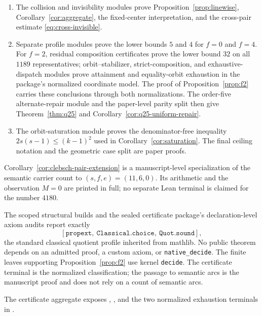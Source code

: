 \begin{enumerate}[leftmargin=2.2em]
      maximum $W(k)=\lfloor(k-1)^2/4\rfloor$, derive the empty-carrier range
      from the phase inequality itself, and prove
      Theorem~\ref{thm:parameterized-repair} for semantic legal-pair finsets.
\item The collision and invisibility modules prove
      Proposition~\ref{prop:linewise}, Corollary~\ref{cor:aggregate}, the
      fixed-center interpretation, and the cross-pair estimate
      \eqref{eq:cross-invisible}.
\item Separate profile modules prove the lower bounds $5$ and $4$ for
      $f=0$ and $f=4$.  For $f=2$, residual composition certificates prove
      the lower bound $32$ on all $1189$ representatives; orbit--stabilizer,
      strict-composition, and exhaustive-dispatch modules prove attainment
      and equality-orbit exhaustion in the package's normalized coordinate
      model.  The proof of Proposition~\ref{prop:f2} carries these conclusions
      through both normalizations.  The order-five
      alternate-repair module and the paper-level parity split then give
      Theorem~\ref{thm:q25} and
      Corollary~\ref{cor:q25-uniform-repair}.
\item The orbit-saturation module proves the denominator-free inequality
      $2s(s-1)\le(k-1)^2$ used in Corollary~\ref{cor:saturation}.  The final
      ceiling notation and the geometric case split are paper proofs.
\end{enumerate}

Corollary~\ref{cor:clebsch-pair-extension} is a manuscript-level
specialization of the semantic carrier count to $(s,f,e)=(11,6,0)$.  Its
arithmetic and the observation $M=0$ are printed in full; no separate Lean
terminal is claimed for the number $4180$.

The scoped structural builds and the sealed certificate package's
declaration-level axiom audits report exactly
\[
  [\texttt{propext},\ \texttt{Classical.choice},\ \texttt{Quot.sound}],
\]
the standard classical quotient profile inherited from mathlib.  No public
theorem depends on an admitted proof, a custom axiom, or
\texttt{native\_decide}.  The finite leaves supporting
Proposition~\ref{prop:f2} use kernel \texttt{decide}.  The certificate terminal
is the normalized classification; the passage to semantic arcs is the
manuscript proof and does not rely on a count of semantic arcs.

The certificate aggregate exposes
,
, and the two normalized
exhaustion terminals in .

